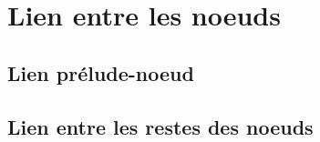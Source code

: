 \chapter{Lien entre les noeuds}

	\section{Lien prélude-noeud}

	\section{Lien entre les restes des noeuds}
